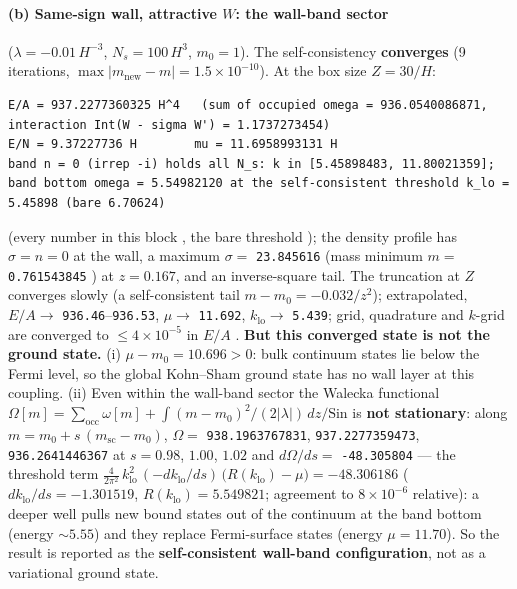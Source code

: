 \paragraph{(b) Same-sign wall, attractive $W$: the wall-band sector} ($\lambda=-0.01\,H^{-3}$,
$N_s=100\,H^3$, $m_0=1$). The self-consistency \textbf{converges} (9 iterations,
$\max|m_{\mathrm{new}}-m|=1.5\times10^{-10}$). At the box size $Z=30/H$:
\begin{Verbatim}[fontsize=\scriptsize]
E/A = 937.2277360325 H^4   (sum of occupied omega = 936.0540086871, interaction Int(W - sigma W') = 1.1737273454)
E/N = 9.37227736 H        mu = 11.6958993131 H
band n = 0 (irrep -i) holds all N_s: k in [5.45898483, 11.80021359]; band bottom omega = 5.54982120 at the self-consistent threshold k_lo = 5.45898 (bare 6.70624)
\end{Verbatim}
(every number in this block , the bare threshold ); the density profile has $\sigma=n=0$ at the wall, a
maximum $\sigma=$ \texttt{23.845616}  (mass minimum $m=$ \texttt{0.761543845}
) at $z=0.167$, and an inverse-square tail. The truncation at $Z$ converges slowly (a
self-consistent tail $m-m_0=-0.032/z^2$); extrapolated, $E/A\to$ \texttt{936.46}--\texttt{936.53},
$\mu\to$ \texttt{11.692}, $k_{\mathrm{lo}}\to$ \texttt{5.439}; grid, quadrature and $k$-grid are converged to $\leq4\times10^{-5}$ in $E/A$
. \textbf{But this converged state is not the ground state.} (i) $\mu-m_0=10.696>0$: bulk
continuum states lie below the Fermi level, so the global Kohn--Sham ground state has no wall layer at this
coupling. (ii) Even within the wall-band sector the Walecka functional
$\Omega[m]=\sum_{\mathrm{occ}}\omega[m]+\int(m-m_0)^2/(2|\lambda|)\,dz/\mathrm{Sin}$ is \textbf{not
stationary}: along $m=m_0+s\,(m_{\mathrm{sc}}-m_0)$, $\Omega=$ \texttt{938.1963767831}, \texttt{937.2277359473},
\texttt{936.2641446367}  at $s=0.98$, $1.00$, $1.02$ and $d\Omega/ds=$ \texttt{-48.305804}
 --- the threshold term
$\frac{4}{2\pi^2}\,k_{\mathrm{lo}}^2\,(-dk_{\mathrm{lo}}/ds)\,\bigl(R(k_{\mathrm{lo}})-\mu\bigr)=-48.306186$
($dk_{\mathrm{lo}}/ds=-1.301519$, $R(k_{\mathrm{lo}})=5.549821$; agreement to $8\times10^{-6}$ relative): a
deeper well pulls new bound states out of the continuum at the band bottom (energy ${\sim}5.55$) and they
replace Fermi-surface states (energy $\mu=11.70$). So the result is reported as the \textbf{self-consistent
wall-band configuration}, not as a variational ground state.

